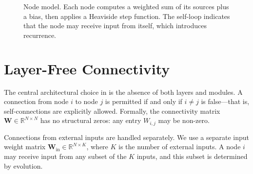 \begin{figure}[h]
  \centering
  \caption{Node model. Each node computes a weighted sum of its
    sources plus a bias, then applies a Heaviside step function. The
    self-loop indicates that the node may receive input from itself,
    which introduces recurrence.}
  \label{fig:method-node}
\end{figure}

\section{Layer-Free Connectivity}
\label{sec:method-connectivity}

The central architectural choice in \modnet{} is the absence of both
layers and modules. A connection from node $i$ to node $j$ is permitted
if and only if $i \neq j$ is false---that is, self-connections are
explicitly allowed. Formally, the connectivity matrix
$\mathbf{W} \in \mathbb{R}^{N \times N}$ has no structural zeros: any
entry $W_{i,j}$ may be non-zero.

Connections from external inputs are handled separately. We use a
separate input weight matrix $\mathbf{W}_{\text{in}} \in
\mathbb{R}^{N \times K}$, where $K$ is the number of external inputs.
A node $i$ may receive input from any subset of the $K$ inputs, and
this subset is determined by evolution.

